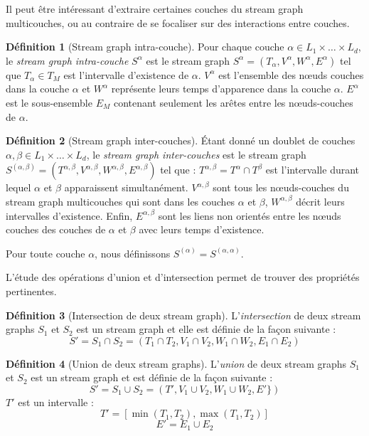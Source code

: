 \documentclass[11pt,a4paper]{article}
\theoremstyle{definition}
\newtheorem{defn}{Définition}
\theoremstyle{remark}
\theoremstyle{remark}
\def \stg {stream graph}
\def \Stg {Stream graph}
\def \stgm {stream graph multicouches}
\def \stgs {stream graphs}
\begin{document}
    \vspace{1cm}

	Il peut être intéressant d'extraire certaines couches du \stgm{}, ou au contraire de se focaliser sur des interactions entre couches.
	 
	\begin{defn}[\Stg{} intra-couche]
	Pour chaque couche $\alpha \in L_1 \times \dots \times L_d$, le {\em \stg{} intra-couche} $S^{\alpha}$ est le \stg{} $S^{\alpha}=(T_{\alpha},V^{\alpha},W^{\alpha},E^{\alpha})$ tel que $ T_{\alpha} \in T_M$ est l'intervalle d'existence de $\alpha$. $V^{\alpha}$ est l'ensemble des nœuds couches dans la couche $\alpha$ et $W^{\alpha}$ représente leurs temps d'apparence dans la couche $\alpha$. $E^{\alpha}$ est le sous-ensemble $E_M$ contenant seulement les arêtes entre les n\oe{}uds-couches de $\alpha$.
	\end{defn}
	
	
	\begin{defn}[\Stg{} inter-couches]	
	\'Etant donné un doublet de couches $\alpha, \beta \in L_1\times \dots\times L_d$, le {\em \stg{} inter-couches} est le \stg{} $S^{(\alpha,\beta)} = (T^{\alpha,\beta}, V^{\alpha,\beta},W^{\alpha,\beta},E^{\alpha,\beta})$ tel que : $T^{\alpha,\beta}=T^{\alpha}\cap T^{\beta}$ est l'intervalle durant lequel $\alpha$ et $\beta$ apparaissent simultanément. $V^{\alpha,\beta}$ sont tous les n\oe{}uds-couches du \stgm{} qui sont dans les couches $\alpha$ et $\beta$, $W^{\alpha,\beta}$ décrit leurs intervalles d'existence. Enfin, $E^{\alpha,\beta}$ sont les liens non orientés entre les n\oe{}uds couches des couches de $\alpha$ et $\beta$ avec leurs temps d'existence.
	\end{defn}
	

	Pour toute couche $\alpha$, nous définissons $S^{(\alpha)}=S^{(\alpha,\alpha)}$.


	L'étude des opérations d'union et d'intersection permet de trouver des propriétés pertinentes.
	
	\begin{defn}[Intersection de deux \stg{}]
	L'{\em intersection} de deux \stgs{} $S_1$ et $S_2$ est un \stg{} et elle est définie de la façon suivante :
	\[
		S' = S_1 \cap S_2 = (T_1\cap T_2, V_1 \cap V_2, W_1 \cap W_2, E_1\cap E_2)
	\]
	\end{defn}
	

	\begin{defn}[Union de deux \stgs{}]
	L'{\em union} de deux \stgs{} $S_1$ et $S_2$ est un \stg{} et est définie de la façon suivante :
	\[
		S' = S_1 \cup S_2 = (T', V_1 \cup V_2, W_1 \cup W_2, E' \})
	\]
	$T'$ est un intervalle :
	\[
		T' = [\min(T_1,T_2),\max(T_1,T_2)]
	\]
	\[
		E' = E_1 \cup E_2 
	\]
	
	\end{defn}
	
\end{document}
